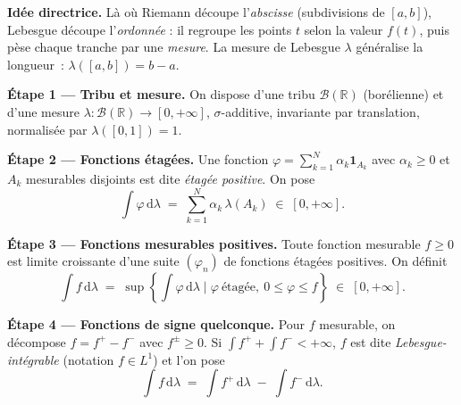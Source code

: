 


\begin{tcolorbox}[thmbox]
  \textbf{Idée directrice.}\enspace%
  Là où Riemann découpe l'\emph{abscisse} (subdivisions de $[a,b]$),
  Lebesgue découpe l'\emph{ordonnée} : il regroupe les points $t$ selon
  la valeur $f(t)$, puis pèse chaque tranche par une \emph{mesure}.
  La mesure de Lebesgue $\lambda$ généralise la longueur~: $\lambda([a,b])=b-a$.

  \medskip
  \textbf{Étape 1 — Tribu et mesure.}\enspace%
  On dispose d'une tribu $\mathcal{B}(\mathbb{R})$ (borélienne) et d'une mesure
  $\lambda : \mathcal{B}(\mathbb{R}) \to [0,+\infty]$, $\sigma$-additive,
  invariante par translation, normalisée par $\lambda([0,1])=1$.

  \medskip
  \textbf{Étape 2 — Fonctions étagées.}\enspace%
  Une fonction $\varphi = \sum_{k=1}^N \alpha_k \mathbf{1}_{A_k}$ avec
  $\alpha_k \geq 0$ et $A_k$ mesurables disjoints est dite
  \emph{étagée positive}. On pose
  \[
    \int \varphi\,\mathrm{d}\lambda \;=\; \sum_{k=1}^N \alpha_k\,\lambda(A_k)
    \;\in\; [0,+\infty].
  \]

  \medskip
  \textbf{Étape 3 — Fonctions mesurables positives.}\enspace%
  Toute fonction mesurable $f \geq 0$ est limite croissante d'une suite
  $(\varphi_n)$ de fonctions étagées positives. On définit
  \[
    \int f\,\mathrm{d}\lambda \;=\; \sup\!\left\{\int \varphi\,\mathrm{d}\lambda
    \;\Big|\; \varphi\ \text{étagée},\ 0\leq\varphi\leq f\right\} \;\in\; [0,+\infty].
  \]

  \medskip
  \textbf{Étape 4 — Fonctions de signe quelconque.}\enspace%
  Pour $f$ mesurable, on décompose $f = f^+ - f^-$ avec $f^{\pm} \geq 0$.
  Si $\int f^+ + \int f^- < +\infty$, $f$ est dite \emph{Lebesgue-intégrable}
  (notation $f \in L^1$) et l'on pose
  \[
    \int f\,\mathrm{d}\lambda \;=\; \int f^+\,\mathrm{d}\lambda
    \;-\; \int f^-\,\mathrm{d}\lambda.
  \]
\end{tcolorbox}

